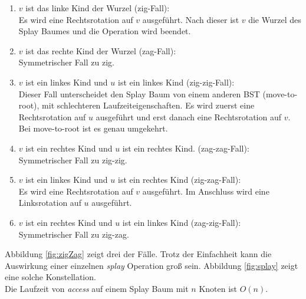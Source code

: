 \documentclass[a4paper,12pt]{article}
\begin{document}
\begin{enumerate}
	\item $v$ ist das linke Kind der Wurzel (zig-Fall):\\
	Es wird eine Rechtsrotation auf $v$ ausgeführt. Nach dieser ist $v$ die Wurzel des Splay Baumes und die Operation wird beendet. 
	\item $v$ ist das rechte Kind der Wurzel (zag-Fall):\\
	Symmetrischer Fall zu zig.
	\item $v$ ist ein linkes Kind und $u$ ist ein linkes Kind (zig-zig-Fall):\\
	Dieser Fall unterscheidet den Splay Baum von einem anderen BST (move-to-root), mit schlechteren Laufzeiteigenschaften. Es wird zuerst eine Rechtsrotation auf $u$ ausgeführt und erst danach eine Rechtsrotation auf $v$. Bei move-to-root  ist es genau umgekehrt. 
	\item $v$ ist ein rechtes Kind und $u$ ist ein rechtes Kind. (zag-zag-Fall):\\
	Symmetrischer Fall zu zig-zig.
	\item $v$ ist ein linkes Kind und $u$ ist ein rechtes Kind (zig-zag-Fall):\\
	Es wird eine Rechtsrotation auf $v$ ausgeführt. Im Anschluss wird eine Linksrotation auf $u$ ausgeführt.
	\item $v$ ist ein rechtes Kind und $u$ ist ein linkes Kind (zag-zig-Fall):\\
	Symmetrischer Fall zu zig-zag.
	
\end{enumerate}
Abbildung  \ref{fig:zigZag} zeigt drei der Fälle. Trotz der Einfachheit kann die Auswirkung einer einzelnen \textit{splay} Operation groß sein. Abbildung \ref{fig:splay} \cite{splay} zeigt eine solche Konstellation. \\
Die Laufzeit von \textit{access} auf einem Splay Baum mit $n$ Knoten ist $O\left(n\right)$.
\end{document}

